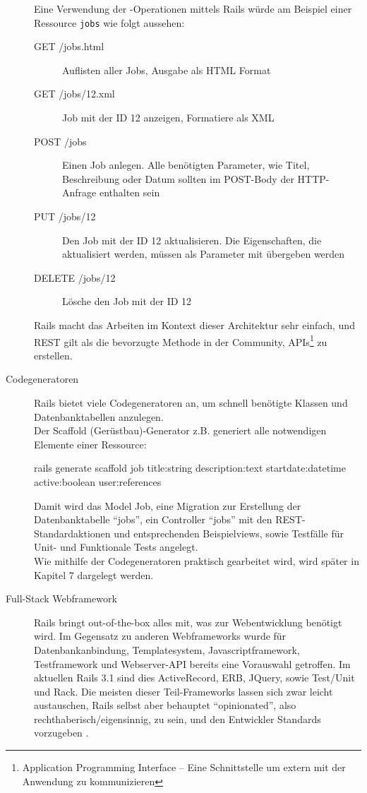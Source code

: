 \begin{description}
 Eine Verwendung der -Operationen mittels Rails würde am Beispiel einer Ressource \texttt{jobs} wie folgt aussehen:
  \begin{description}
  \item[GET /jobs.html] Auflisten aller Jobs, Ausgabe als HTML Format
  \item[GET /jobs/12.xml] Job mit der ID 12 anzeigen, Formatiere als XML
  \item[POST /jobs] Einen Job anlegen. Alle benötigten Parameter, wie Titel, Beschreibung oder Datum sollten im POST-Body der HTTP-Anfrage enthalten sein
  \item[PUT /jobs/12] Den Job mit der ID 12 aktualisieren. Die Eigenschaften, die aktualisiert werden, müssen als Parameter mit übergeben werden
  \item[DELETE /jobs/12] Lösche den Job mit der ID 12
  \end{description}
 Rails macht das Arbeiten im Kontext dieser Architektur sehr einfach, und REST gilt als die bevorzugte Methode in der Community, APIs\footnote{Application Programming Interface --  Eine Schnittstelle um extern mit der Anwendung zu kommunizieren} zu erstellen.
 \item[Codegeneratoren] Rails bietet viele Codegeneratoren an, um schnell benötigte Klassen und Datenbanktabellen anzulegen.
\\ Der Scaffold (Gerüstbau)-Generator z.B. generiert alle notwendigen Elemente einer Ressource:
\begin{ruby}[label=test/test\_feed.rb]
rails generate scaffold job title:string description:text 
  start\PYZus{}date:datetime active:boolean user:references
\end{ruby}
  Damit wird das Model Job, eine Migration zur Erstellung der Datenbanktabelle "`jobs"', ein Controller "`jobs"' mit den REST-Standardaktionen und entsprechenden Beispielviews, sowie Testfälle für Unit- und Funktionale Tests angelegt. \\
  Wie mithilfe der Codegeneratoren praktisch gearbeitet wird, wird später in Kapitel 7 dargelegt werden.
 \item[Full-Stack Webframework] Rails bringt out-of-the-box alles mit, was zur Webentwicklung benötigt wird. Im Gegensatz zu anderen Webframeworks wurde für Datenbankanbindung, Templatesystem, Javascriptframework, Testframework und Webserver-API bereits eine Vorauswahl getroffen. Im aktuellen Rails 3.1 sind dies ActiveRecord, ERB, JQuery, sowie Test/Unit und Rack. Die meisten dieser Teil-Frameworks lassen sich zwar leicht austauschen, Rails selbst aber behauptet "`opinionated"', also rechthaberisch/eigensinnig, zu sein, und den Entwickler Standards vorzugeben \citep{david_heinemeier_hansson_railsconf_2011}.

\end{description}

